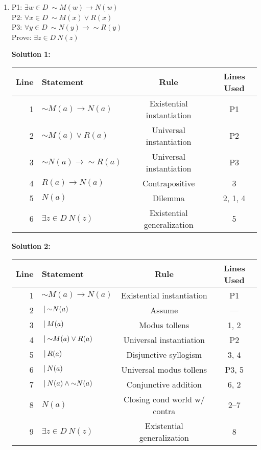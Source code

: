 \documentclass[12pt, letterpaper]{report}
\newcommand{\nott}{{\sim}}
\begin{document}
\begin{enumerate}
\begin{enumerate}
\item P1: $\exists w \in D \ \nott M(w) \to N(w)$ \\
        P2: $\forall x \in D \ \nott M(x) \lor R(x)$ \\
        P3: $\forall y \in D \ \nott N(y) \to \nott R(y)$ \\
        Prove: $\exists z \in D \ N(z)$
        
        
        \textbf{Solution 1:}
        
        \begin{tabular}{|r|l|c|c|} \hline
                Line & Statement & Rule & Lines Used \\ \hline
                1 & $\nott M(a) \to N(a)$ & Existential instantiation & P1 \\ \hline
                2 & $\nott M(a) \lor R(a)$ & Universal instantiation & P2 \\ \hline
                3 & $\nott N(a) \to \nott R(a)$ & Universal instantiation & P3 \\ \hline
                4 & $ R(a) \to N(a)$ & Contrapositive & 3 \\ \hline
                5 & $N(a)$ & Dilemma & 2, 1, 4 \\ \hline
                6 & $\exists z \in D \ N(z)$ & Existential generalization & 5 \\ \hline
                \end{tabular}
                
        \textbf{Solution 2:}
        
        \begin{tabular}{|r|l|c|c|} \hline
                Line & Statement & Rule & Lines Used \\ \hline
                1 & $\nott M(a) \to N(a)$ & Existential instantiation & P1 \\ \hline
                2 & $\ \vline \ \nott N(a)$ & Assume & --- \\ \hline
                3 & $\ \vline \ M(a)$ & Modus tollens & 1, 2 \\ \hline
                4 & $\ \vline \ \nott M(a) \lor R(a)$ & Universal instantiation & P2 \\ \hline
                5 & $\ \vline \ R(a)$ & Disjunctive syllogism & 3, 4 \\ \hline
                6 & $\ \vline \ N(a)$ & Universal modus tollens & P3, 5 \\ \hline
                7 & $\ \vline \ N(a)\land \nott N(a)$ & Conjunctive addition & 6, 2 \\ \hline
                8 & $N(a)$ & Closing cond world w/ contra & 2--7 \\ \hline
                9 & $\exists z \in D \ N(z)$ & Existential generalization & 8 \\ \hline
                

\end{tabular}
\end{enumerate}
\end{enumerate}
\end{document}
